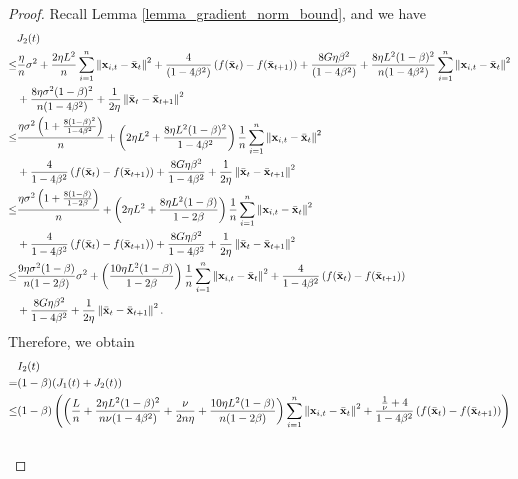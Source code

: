 \documentclass{article}
\begin{document}
\begin{proof}
Recall Lemma \ref{lemma_gradient_norm_bound}, and we have
\begin{align}
\nonumber
& J_2(t) \\ \nonumber 
\le & \frac{\eta}{n} \sigma^2 + \frac{2\eta L^2}{n}\sum_{i=1}^n \left\lVert{\bf x}_{i,t} - \bar{{\bf x}}_t \right\rVert^2 + \frac{4}{(1-4\beta^2)}\left(  f(\bar{{\bf x}}_t) - f(\bar{{\bf x}}_{t+1})  \right) + \frac{8 G\eta \beta^2}{(1-4\beta^2)} + \frac{8\eta L^2 (1-\beta)^2}{n(1-4\beta^2)}\sum_{i=1}^n \left\lVert{\bf x}_{i,t} - \bar{{\bf x}}_t\right\rVert^2  \\ \nonumber
& + \frac{8\eta \sigma^2 (1-\beta)^2}{n(1-4\beta^2)} + \frac{1}{2\eta} \left\lVert \bar{{\bf x}}_t - \bar{{\bf x}}_{t+1}\right\rVert^2 \\ \nonumber
\le & \frac{\eta \sigma^2 \left( 1+\frac{8(1-\beta)^2}{1-4\beta^2} \right)}{n}  + \left(  2\eta L^2 + \frac{8\eta L^2(1-\beta)^2}{1-4\beta^2}  \right)\frac{1}{n}\sum_{i=1}^n \left\lVert{\bf x}_{i,t} - \bar{{\bf x}}_t\right\rVert^2 \\ \nonumber 
&+ \frac{4}{1-4\beta^2}\left(  f(\bar{{\bf x}}_t) - f(\bar{{\bf x}}_{t+1})  \right) + \frac{8G\eta \beta^2}{1-4\beta^2} + \frac{1}{2\eta} \left\lVert \bar{{\bf x}}_t - \bar{{\bf x}}_{t+1}\right\rVert^2 \\ \nonumber
\le & \frac{\eta \sigma^2 \left( 1+\frac{8(1-\beta)}{1-2\beta} \right)}{n}  + \left(  2\eta L^2 + \frac{8\eta L^2(1-\beta)}{1-2\beta}  \right)\frac{1}{n}\sum_{i=1}^n \left\lVert{\bf x}_{i,t} - \bar{{\bf x}}_t\right\rVert^2 \\ \nonumber 
&+ \frac{4}{1-4\beta^2}\left(  f(\bar{{\bf x}}_t) - f(\bar{{\bf x}}_{t+1})  \right) + \frac{8G\eta \beta^2}{1-4\beta^2} + \frac{1}{2\eta} \left\lVert \bar{{\bf x}}_t - \bar{{\bf x}}_{t+1}\right\rVert^2 \\ \nonumber
\le & \frac{9\eta \sigma^2(1-\beta)}{n(1-2\beta)} \sigma^2 + \left(  \frac{10\eta L^2(1-\beta)}{1-2\beta}  \right)\frac{1}{n}\sum_{i=1}^n \left\lVert{\bf x}_{i,t} - \bar{{\bf x}}_t\right\rVert^2 + \frac{4}{1-4\beta^2}\left(  f(\bar{{\bf x}}_t) - f(\bar{{\bf x}}_{t+1})  \right) \\ \nonumber
& + \frac{8G\eta \beta^2}{1-4\beta^2} + \frac{1}{2\eta} \left\lVert \bar{{\bf x}}_t - \bar{{\bf x}}_{t+1}\right\rVert^2.
\end{align} Therefore, we obtain
\begin{align}
\nonumber
& I_2(t) \\ \nonumber 
= & (1-\beta)(J_1(t) + J_2(t)) \\ \nonumber
\le & (1-\beta) \lrincir{ \lrincir{ \frac{L}{n} + \frac{2\eta L^2(1-\beta)^2}{n\nu(1-4\beta^2)} + \frac{\nu}{2n\eta} + \frac{10\eta L^2(1-\beta)}{n(1-2\beta)} }\sum_{i=1}^n\lrnorm{\x_{i,t} - \bar{\x}_t }^2 +  \frac{\frac{1}{\nu}+4}{1-4\beta^2}\lrincir{f(\bar{\x}_t) - f(\bar{\x}_{t+1})} }\\ \nonumber 

\end{align}
\end{proof}
\end{document}
